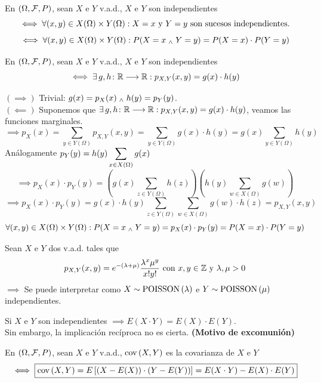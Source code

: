 \begin{defn}[Independencia de v.a.d.]
	En $(\Omega, \mathcal{F}, P)$, sean $X$ e $Y$ v.a.d., $X$ e $Y$ son independientes
	\[\iff \forall (x,y) \in X(\Omega)\times Y(\Omega) : {X=x} \text{ y } {Y=y} \text{ son sucesos independientes.}\]
	\[\iff \forall (x,y) \in X(\Omega)\times Y(\Omega) : P(X=x\; _{\wedge} \; Y=y)=P(X=x)\cdot P(Y=y)\]
\end{defn}
\begin{teo}
	En $(\Omega, \mathcal{F}, P)$, sean $X$ e $Y$ v.a.d., $X$ e $Y$ son independientes
	\[\iff \exists \, g, h \colon \mathbb{R} \longrightarrow \mathbb{R} : p_{X,Y}(x,y)=g(x)\cdot h(y)\]
	\begin{dem}
		$(\implies)$ Trivial: $g(x)=p_X(x) \; _{\wedge} \; h(y)=p_Y(y)$.\\
		$(\impliedby)$ Suponemos que $\exists \, g, h \colon \mathbb{R} \longrightarrow \mathbb{R} : p_{X,Y}(x,y)=g(x)\cdot h(y)$, veamos las funciones marginales.
		\[\implies p_X(x) = \sum_{y\in Y(\Omega)} p_{X, Y}(x,y) = \sum_{y\in Y(\Omega)} g(x)\cdot h(y) = g(x) \sum_{y\in Y(\Omega)} h(y)\]
		Análogamente $\displaystyle p_Y(y)=h(y) \sum_{x\in X(\Omega)} g(x)$
		\[\implies p_X(x)\cdot p_Y(y) = \left(g(x) \sum_{z\in Y(\Omega)} h(z)\right)\left(h(y) \sum_{w\in X(\Omega)} g(w)\right)\]
		\[\implies p_X(x)\cdot p_Y(y) = g(x)\cdot h(y) \sum_{z\in Y(\Omega)} \sum_{w\in X(\Omega)} g(w)\cdot h(z) = p_{X, Y}(x, y)\]
		\[\forall (x, y) \in X(\Omega) \times Y(\Omega) : P(X=x \; _{\wedge} \; Y=y) = p_{X}(x) \cdot p_Y(y) = P(X=x) \cdot P(Y=y)\]
	\end{dem}
\end{teo}
\begin{ejem}
	Sean $X$ e $Y$ dos v.a.d. tales que
	\[p_{X, Y}(x,y) = e^{-(\lambda+\mu)}\frac{\lambda^x\mu^y}{x! y!} \text{ con } x,y \in \mathbb{Z} \text{ y } \lambda, \mu >0\]
	$\implies$ Se puede interpretar como $X\sim\operatorname{POISSON}\left(\lambda\right)$ e $Y\sim\operatorname{POISSON}\left(\mu\right)$ independientes.
\end{ejem}

\begin{obs}
	Si $X$ e $Y$ son independientes $\implies E(X\cdot Y)=E(X)\cdot E(Y)$. \\
	Sin embargo, la implicación recíproca no es cierta. \hfill \textbf{(Motivo de excomunión)}
\end{obs}

\begin{defn}[Covarianza]
	En $(\Omega, \mathcal{F}, P)$, sean $X$ e $Y$ v.a.d., $\operatorname{cov}\left(X, Y\right)$ es la covarianza de $X$ e $Y$
	\[\iff \boxed{\operatorname{cov}\left(X, Y\right) = E\left[(X-E(X))\cdot (Y-E(Y))\right] = E(X\cdot Y)-E(X)\cdot E(Y)}\]
\end{defn}

